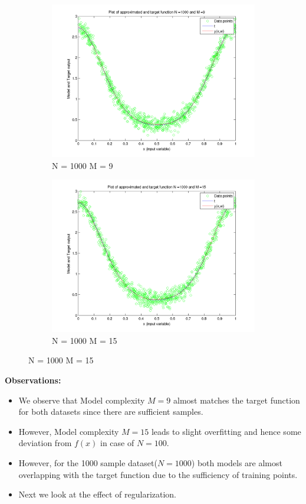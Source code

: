 \documentclass{article}
\begin{document}
\begin{figure}[H]
\begin{subfigure}{.5\textwidth}
\centering
\includegraphics[width=\linewidth]{VaryingN_N1000M9}
\caption{N = 1000 M = 9}
\end{subfigure}
\begin{subfigure}{.5\textwidth}
\includegraphics[width=\linewidth]{VaryingN_N1000M15}
\caption{N = 1000 M = 15}
\end{subfigure}



\end{figure}

\textbf{Observations: }
\begin{itemize}
\item We observe that Model complexity $M=9$ almost matches the target function for both datasets since there are sufficient samples.
\item However, Model complexity $M=15$ leads to slight overfitting and hence some deviation from $f(x)$ in case of $N = 100$.
\item However, for the 1000 sample dataset($N = 1000$) both models are almost overlapping with the target function due to the sufficiency of training points.
\item Next we look at the effect of regularization.
\end{itemize}
\newpage
\end{document}
